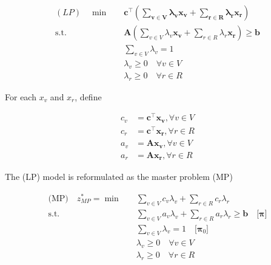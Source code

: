             \begin{align*}
                (LP) \quad \min \quad & \mathbf{c^\top (\sum_{v \in V} \lambda_v \mathbf{x_v} + \sum_{r \in R}\lambda_r \mathbf{x_r})} \\
                \text{s.t.} \quad & \mathbf{A} (\sum_{v \in V} \lambda_v \mathbf{x_v} + \sum_{r \in R}\lambda_r \mathbf{x_r}) \ge \mathbf{b} \\
                & \sum_{v \in V} \lambda_v = 1\\
                & \lambda_v \ge 0 \quad \forall v \in V\\
                & \lambda_r \ge 0 \quad \forall r \in R
            \end{align*}

            For each $x_v$ and $x_r$, define

            \begin{align*}
                c_v &= \mathbf{c^\top x_v}, \forall v \in V \\
                c_r &= \mathbf{c^\top x_r}, \forall r \in R\\
                a_v &= \mathbf{A x_v},  \forall v\in V\\
                a_r &= \mathbf{A x_r}, \forall r \in R
            \end{align*}

            The (LP) model is reformulated as the master problem (MP)

            \begin{align*}
                \text{(MP)} \quad z_{MP}^* = \min \quad & \sum_{v \in V} c_v \lambda_v + \sum_{r \in R} c_r \lambda_r\\
                \text{s.t.} \quad & \sum_{v \in V} a_v \lambda_v + \sum_{r \in R} a_r \lambda_r \ge \mathbf{b} \quad \text{[$\mathbf{\pi}$]}\\
                & \sum_{v \in V} \lambda_v = 1 \quad \text{[$\mathbf{\pi}_0]$}\\
                & \lambda_v \ge 0 \quad \forall v \in V\\
                & \lambda_r \ge 0 \quad \forall r \in R
            \end{align*}

